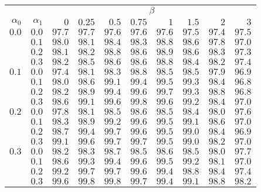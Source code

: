 \begin{tabular}{rr|rrrrrrrr}
\hline\hline
 && \multicolumn{8}{c}{$\beta$}\\
 $\alpha_0$ & $\alpha_1$ & $0$ & $0.25$ & $0.5$ & $0.75$ & $1$ & $1.5$ & $2$ & $3$ \\ 
 \hline
$0.0$ & $0.0$ & $97.7$ & $97.7$ & $97.6$ & $97.6$ & $97.6$ & $97.5$ & $97.4$ & $97.5$\\ 
 & $0.1$ & $98.0$ & $98.1$ & $98.4$ & $98.3$ & $98.8$ & $98.6$ & $97.8$ & $97.0$\\ 
 & $0.2$ & $98.1$ & $98.2$ & $98.8$ & $98.6$ & $98.9$ & $98.6$ & $98.3$ & $97.3$\\ 
 & $0.3$ & $98.2$ & $98.5$ & $98.6$ & $98.6$ & $98.8$ & $98.4$ & $98.2$ & $97.4$\\ 
\hline 
 $0.1$ & $0.0$ & $97.4$ & $98.1$ & $98.3$ & $98.8$ & $98.5$ & $98.5$ & $97.9$ & $96.9$\\ 
 & $0.1$ & $98.0$ & $98.6$ & $99.1$ & $99.4$ & $99.5$ & $99.3$ & $98.4$ & $96.8$\\ 
 & $0.2$ & $98.2$ & $98.9$ & $99.4$ & $99.6$ & $99.7$ & $99.3$ & $98.8$ & $96.8$\\ 
 & $0.3$ & $98.6$ & $99.1$ & $99.6$ & $99.8$ & $99.6$ & $99.2$ & $98.4$ & $97.0$\\ 
\hline 
 $0.2$ & $0.0$ & $97.8$ & $98.1$ & $98.5$ & $98.6$ & $98.5$ & $98.4$ & $98.0$ & $97.6$\\ 
 & $0.1$ & $98.3$ & $98.9$ & $99.2$ & $99.6$ & $99.5$ & $99.1$ & $98.6$ & $97.0$\\ 
 & $0.2$ & $98.7$ & $99.4$ & $99.7$ & $99.6$ & $99.5$ & $99.0$ & $98.4$ & $96.9$\\ 
 & $0.3$ & $99.1$ & $99.6$ & $99.7$ & $99.7$ & $99.5$ & $99.0$ & $98.2$ & $97.0$\\ 
\hline 
 $0.3$ & $0.0$ & $98.2$ & $98.3$ & $98.7$ & $98.5$ & $98.6$ & $98.5$ & $98.0$ & $97.7$\\ 
 & $0.1$ & $98.6$ & $99.3$ & $99.4$ & $99.6$ & $99.5$ & $99.2$ & $98.1$ & $97.0$\\ 
 & $0.2$ & $99.2$ & $99.7$ & $99.7$ & $99.6$ & $99.4$ & $98.8$ & $98.4$ & $97.4$\\ 
 & $0.3$ & $99.6$ & $99.8$ & $99.8$ & $99.7$ & $99.4$ & $99.1$ & $98.8$ & $98.2$\\ 
 \hline 
 \end{tabular}